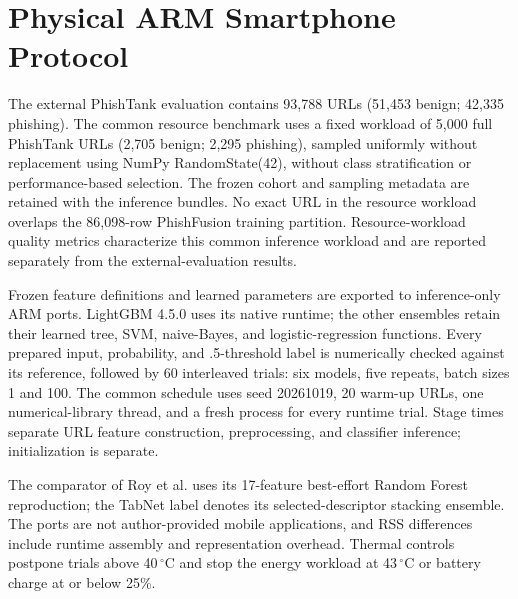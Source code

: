 \documentclass[10pt]{article}
\newenvironment{bluechange}{\color{black}}{}
\begin{document}
\section{Physical ARM Smartphone Protocol}
\begin{bluechange}
The external PhishTank evaluation contains 93,788 URLs (51,453 benign; 42,335 phishing). The common resource benchmark uses a fixed workload of 5,000 full PhishTank URLs (2,705 benign; 2,295 phishing), sampled uniformly without replacement using NumPy RandomState(42), without class stratification or performance-based selection. The frozen cohort and sampling metadata are retained with the inference bundles. No exact URL in the resource workload overlaps the 86,098-row PhishFusion training partition. Resource-workload quality metrics characterize this common inference workload and are reported separately from the external-evaluation results.

Frozen feature definitions and learned parameters are exported to inference-only ARM ports. LightGBM 4.5.0 uses its native runtime; the other ensembles retain their learned tree, SVM, naive-Bayes, and logistic-regression functions. Every prepared input, probability, and .5-threshold label is numerically checked against its reference, followed by 60 interleaved trials: six models, five repeats, batch sizes 1 and 100. The common schedule uses seed 20261019, 20 warm-up URLs, one numerical-library thread, and a fresh process for every runtime trial. Stage times separate URL feature construction, preprocessing, and classifier inference; initialization is separate.

The comparator of Roy et al. uses its 17-feature best-effort Random Forest reproduction; the TabNet label denotes its selected-descriptor stacking ensemble. The ports are not author-provided mobile applications, and RSS differences include runtime assembly and representation overhead. Thermal controls postpone trials above 40\,${}^{\circ}$C and stop the energy workload at 43\,${}^{\circ}$C or battery charge at or below 25\%.
\end{bluechange}
\end{document}
